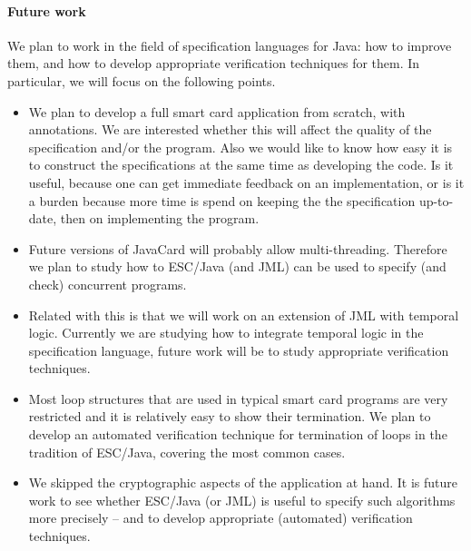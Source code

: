\documentclass[a4paper]{llncs}
\begin{document}
\paragraph{Future work} We plan to work in the field of
specification languages for Java: how to improve them, and how to
develop appropriate verification techniques for them. In particular,
we will focus on the following points.
\begin{itemize}
\item We plan to develop a full smart card application from scratch, with
annotations. We are interested whether this will affect the quality of 
the specification and/or the program. Also we would like to know how
easy it is to construct the specifications at the same time as
developing the code. Is it useful, because one can get immediate
feedback on an implementation, or is it a burden because more time
is spend on keeping the the specification up-to-date, then on
implementing the program.
\item Future versions of JavaCard will probably allow
multi-threading. Therefore we plan to study how to ESC/Java (and JML)
can be used to specify (and check) concurrent programs.
\item Related with this is that we will work on an extension of JML with
temporal logic. Currently we are studying how to integrate temporal
logic in the specification language, future work will be to study
appropriate verification techniques.
\item Most loop structures that are used in typical smart card
programs are very restricted and it is relatively easy to show their
termination. We plan to develop an automated verification technique for
termination of loops in the tradition of ESC/Java, covering the most
common cases.
\item We skipped the cryptographic aspects of the application at
hand. It is future work to see whether ESC/Java (or JML) is useful to
specify such algorithms more precisely -- and to develop appropriate
(automated) verification techniques.
\end{itemize}



\end{document}
